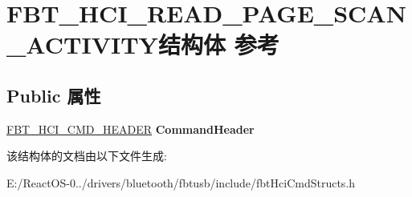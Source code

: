 \hypertarget{struct_f_b_t___h_c_i___r_e_a_d___p_a_g_e___s_c_a_n___a_c_t_i_v_i_t_y}{}\section{F\+B\+T\+\_\+\+H\+C\+I\+\_\+\+R\+E\+A\+D\+\_\+\+P\+A\+G\+E\+\_\+\+S\+C\+A\+N\+\_\+\+A\+C\+T\+I\+V\+I\+T\+Y结构体 参考}
\label{struct_f_b_t___h_c_i___r_e_a_d___p_a_g_e___s_c_a_n___a_c_t_i_v_i_t_y}
\subsection*{Public 属性}
\begin{DoxyCompactItemize}
\item 
\mbox{\label{struct_f_b_t___h_c_i___r_e_a_d___p_a_g_e___s_c_a_n___a_c_t_i_v_i_t_y_a9b033579bf78040dc110fa56002d7907}} 
\hyperlink{struct_f_b_t___h_c_i___c_m_d___h_e_a_d_e_r}{F\+B\+T\+\_\+\+H\+C\+I\+\_\+\+C\+M\+D\+\_\+\+H\+E\+A\+D\+ER} {\bfseries Command\+Header}
\end{DoxyCompactItemize}


该结构体的文档由以下文件生成\+:\begin{DoxyCompactItemize}
\item 
E\+:/\+React\+O\+S-\/0../drivers/bluetooth/fbtusb/include/fbt\+Hci\+Cmd\+Structs.\+h\end{DoxyCompactItemize}
